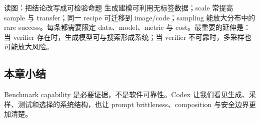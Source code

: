 \begin{knowledgebox}{读图：把结论改写成可检验命题}
生成建模可利用无标签数据；scale 常提高 sample 与 transfer；同一 recipe 可迁移到 image/code；sampling 能放大分布中的 rare success。每条都需要限定 data、model、metric 与 cost。最重要的延伸是：当 verifier 存在时，生成模型可与搜索形成系统；当 verifier 不可靠时，多采样也可能放大风险。
\end{knowledgebox}


\subsection{本章小结}

Benchmark capability 是必要证据，不是软件可靠性。Codex 让我们看见生成、采样、测试和选择的系统结构，也让 prompt brittleness、composition 与安全边界更加清楚。

